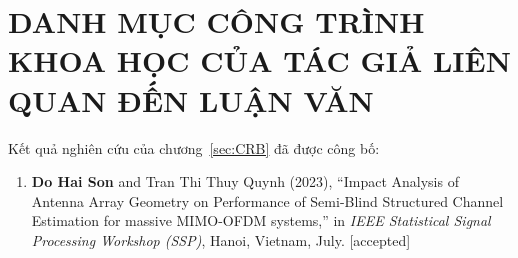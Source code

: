 \clearpage
{}

\chapter*{DANH MỤC CÔNG TRÌNH KHOA HỌC CỦA TÁC GIẢ LIÊN QUAN ĐẾN LUẬN VĂN}

\noindent Kết quả nghiên cứu của chương~\ref{sec:CRB} đã được công bố:
\begin{enumerate}
    \item[] \textbf{Do Hai Son} and Tran Thi Thuy Quynh (2023), ``Impact Analysis of Antenna Array Geometry on Performance of Semi-Blind Structured Channel Estimation for massive MIMO-OFDM systems,'' in \textit{IEEE Statistical Signal Processing Workshop (SSP)}, Hanoi, Vietnam, July. [accepted]
\end{enumerate}

